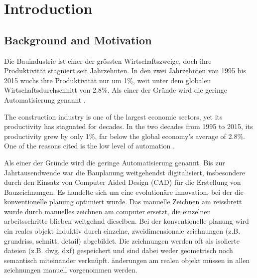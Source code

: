 \chapter{Introduction}
\label{sec:introduction}

\section{Background and Motivation}
\label{sec:background_motivation}
\begin{German}
    Die Bauindustrie ist einer der grössten Wirtschaftszweige, doch ihre Produktivität stagniert seit Jahrzehnten. In den zwei Jahrzehnten von 1995 bis 2015 wuchs ihre Produktivität nur um 1\%, weit unter dem globalen Wirtschaftsdurchschnitt von 2.8\%. Als einer der Gründe wird die geringe Automatisierung genannt \cite{barbosaReinventingConstructionRoute2017}.
\end{German}
\begin{English}
    The construction industry is one of the largest economic sectors, yet its productivity has stagnated for decades. In the two decades from 1995 to 2015, its productivity grew by only 1\%, far below the global economy's average of 2.8\%. One of the reasons cited is the low level of automation \cite{barbosaReinventingConstructionRoute2017}.
\end{English}

\begin{German}
    Als einer der Gründe wird die geringe Automatisierung genannt. Bis zur Jahrtausendwende war die Bauplanung weitgehendst digitalisiert, insbesondere durch den Einsatz von Computer Aided Design (CAD) für die Erstellung von Bauzeichnungen. Es handelte sich um eine evolutionäre innovation, bei der die konventionelle planung optimiert wurde. Das manuelle Zeichnen am reissbrett wurde durch manuelles zeichnen am computer ersetzt, die einzelnen arbeitsschritte blieben weitgehnd dieselben. Bei der konventionelle planung wird ein reales objekt induktiv durch einzelne, zweidimensionale zeichnungen (z.B. grundriss, schnitt, detail) abgebildet. Die zeichnungen werden oft als isolierte dateien (z.B. dwg, dxf) gespeichert und sind dabei weder geometrisch noch semantisch miteinander verknüpft. änderungen am realen objekt müssen in allen zeichnungen manuell vorgenommen werden.
\end{German}

